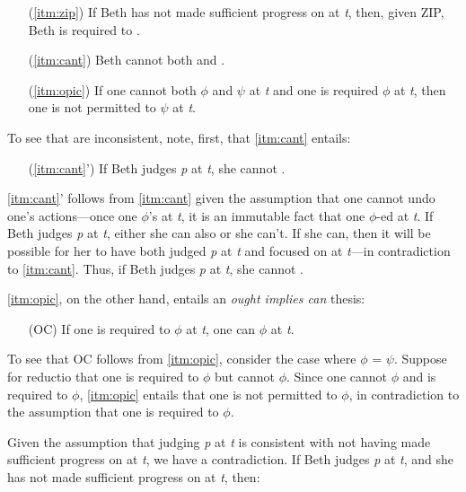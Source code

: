 \documentclass[12pt]{article}
\begin{document}
\begin{enumerate}
    \item[(\ref*{itm:zip})] If Beth has not made sufficient progress on  at \textit{t}, then, given ZIP, Beth is required to \foc{}.
    \item[(\ref*{itm:cant})] Beth cannot both \jud{} and \foc{}.
    \item[(\ref*{itm:opic})] If one cannot both $\phi$ and $\psi$ at \textit{t} and one is required $\phi$ at \textit{t}, then one is not permitted to $\psi$ at \textit{t}.
\end{enumerate}
%
To see that \psub{} are inconsistent, note, first, that \ref*{itm:cant} entails:

\begin{enumerate}
    \item[(\ref*{itm:cant}')] If Beth judges \textit{p} at \textit{t}, she cannot \foc{}.
\end{enumerate}
%
\ref*{itm:cant}' follows from \ref*{itm:cant} given the assumption that one cannot undo one's actions---once one $\phi$'s at \textit{t}, it is an immutable fact that one $\phi$-ed at \textit{t}. If Beth judges \textit{p} at \textit{t}, either she can also \foc{} or she can't. If she can, then it will be possible for her to have both judged \textit{p} at \textit{t} and focused on  at \textit{t}---in contradiction to \ref*{itm:cant}. Thus, if Beth judges \textit{p} at \textit{t}, she cannot \foc{}.

\ref*{itm:opic}, on the other hand, entails an \textit{ought implies can} thesis:

\begin{enumerate}
    \item[(OC)] If one is required to $\phi$ at \textit{t}, one can $\phi$ at \textit{t}.
\end{enumerate}
%
To see that OC follows from \ref*{itm:opic}, consider the case where $\phi$ = $\psi$. Suppose for reductio that one is required to $\phi$ but cannot $\phi$. Since one cannot $\phi$ and is required to $\phi$, \ref*{itm:opic} entails that one is not permitted to $\phi$, in contradiction to the assumption that one is required to $\phi$.

Given the assumption that judging \textit{p} at \textit{t} is consistent with not having made sufficient progress on  at \textit{t}, we have a contradiction. If Beth judges \textit{p} at \textit{t}, and she has not made sufficient progress on  at \textit{t}, then:
\end{document}
